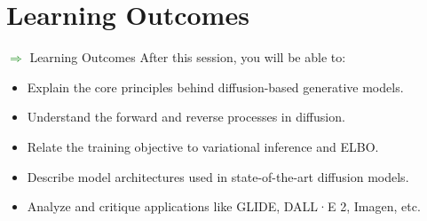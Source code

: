 \section{Learning Outcomes}
\begin{frame}[allowframebreaks]{\textcolor{green}{$\Rightarrow$} Learning Outcomes}
    After this session, you will be able to:
    \begin{itemize}
        \item Explain the core principles behind diffusion-based generative models.
        \item Understand the forward and reverse processes in diffusion.
        \item Relate the training objective to variational inference and ELBO.
        \item Describe model architectures used in state-of-the-art diffusion models.
        \item Analyze and critique applications like GLIDE, DALL·E 2, Imagen, etc.
    \end{itemize}
\end{frame}